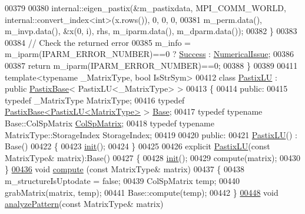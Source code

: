 \begin{DoxyCode}
00379   
00380     internal::eigen\_pastix(&m\_pastixdata, MPI\_COMM\_WORLD, internal::convert\_index<int>(x.rows()), 0, 0, 0,
00381                            m\_perm.data(), m\_invp.data(), &x(0, i), rhs, m\_iparm.data(), m\_dparm.data());
00382   \}
00383   
00384   \textcolor{comment}{// Check the returned error}
00385   m\_info = m\_iparm(IPARM\_ERROR\_NUMBER)==0 ? \hyperlink{group__enums_gga85fad7b87587764e5cf6b513a9e0ee5ea52581b035f4b59c203b8ff999ef5fcea}{Success} : \hyperlink{group__enums_gga85fad7b87587764e5cf6b513a9e0ee5eaaf9b736d310a664e7729d163a035cc5f}{NumericalIssue};
00386   
00387   \textcolor{keywordflow}{return} m\_iparm(IPARM\_ERROR\_NUMBER)==0;
00388 \}
00389 
00411 \textcolor{keyword}{template}<\textcolor{keyword}{typename} \_MatrixType, \textcolor{keywordtype}{bool} IsStrSym>
00412 \textcolor{keyword}{class }\hyperlink{class_eigen_1_1_pastix_l_u}{PastixLU} : \textcolor{keyword}{public} \hyperlink{class_eigen_1_1_pastix_base}{PastixBase}< PastixLU<\_MatrixType> >
00413 \{
00414   \textcolor{keyword}{public}:
00415     \textcolor{keyword}{typedef} \_MatrixType MatrixType;
00416     \textcolor{keyword}{typedef} \hyperlink{class_eigen_1_1_pastix_base}{PastixBase<PastixLU<MatrixType>} > 
      \hyperlink{group___sparse_core___module}{Base};
00417     \textcolor{keyword}{typedef} \textcolor{keyword}{typename} Base::ColSpMatrix \hyperlink{group___sparse_core___module}{ColSpMatrix};
00418     \textcolor{keyword}{typedef} \textcolor{keyword}{typename} MatrixType::StorageIndex StorageIndex;
00419     
00420   \textcolor{keyword}{public}:
00421     \hyperlink{class_eigen_1_1_pastix_l_u}{PastixLU}() : Base()
00422     \{
00423       \hyperlink{structinit}{init}();
00424     \}
00425     
00426     \textcolor{keyword}{explicit} \hyperlink{class_eigen_1_1_pastix_l_u}{PastixLU}(\textcolor{keyword}{const} MatrixType& matrix):Base()
00427     \{
00428       \hyperlink{structinit}{init}();
00429       compute(matrix);
00430     \}
\hyperlink{class_eigen_1_1_pastix_l_u_adc28ee2550086c7bdfe991d624bde2ee}{00436}     \textcolor{keywordtype}{void} \hyperlink{class_eigen_1_1_pastix_l_u_adc28ee2550086c7bdfe991d624bde2ee}{compute} (\textcolor{keyword}{const} MatrixType& matrix)
00437     \{
00438       m\_structureIsUptodate = \textcolor{keyword}{false};
00439       ColSpMatrix temp;
00440       grabMatrix(matrix, temp);
00441       Base::compute(temp);
00442     \}
\hyperlink{class_eigen_1_1_pastix_l_u_abae3ca7f1254106d9e2d5e0f273189fa}{00448}     \textcolor{keywordtype}{void} \hyperlink{class_eigen_1_1_pastix_l_u_abae3ca7f1254106d9e2d5e0f273189fa}{analyzePattern}(\textcolor{keyword}{const} MatrixType& matrix)

\end{DoxyCode}
